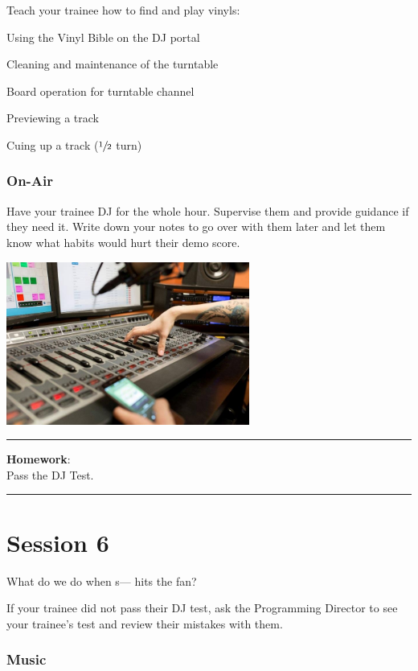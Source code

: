 \documentclass[]{witrman}
\newcommand{\makehomework}[1]{%
\vspace{1mm}
\rule{\textwidth}{1pt}
\textbf{Homework}:\\
#1\\
\rule[2mm]{\textwidth}{1pt}
}
\begin{document}
Teach your trainee how to find and play vinyls:
\begin{tightitemize}
    \item Using the Vinyl Bible on the DJ portal
    \item Cleaning and maintenance of the turntable
    \item Board operation for turntable channel
    \item Previewing a track
    \item Cuing up a track ($\sfrac{1}{2}$ turn)
\end{tightitemize}

\subsection{On-Air}

Have your trainee DJ for the whole hour.  Supervise them and provide guidance if
they need it.  Write down your notes to go over with them later and let them
know what habits would hurt their demo score.

\begin{center}
    \includegraphics[width=8cm]{images/console}
\end{center}

\makehomework{Pass the DJ Test.}


\chapter{Session 6}

What do we do when s--- hits the fan?

If your trainee did not pass their DJ test, ask the Programming Director to see
your trainee's test and review their mistakes with them.

\subsection{Music}
\end{document}
